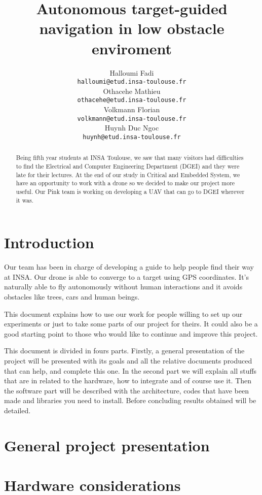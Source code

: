 \documentclass[10pt,a4paper,titlepage]{report}
\author{Halloumi Fadi\\\texttt{halloumi@etud.insa-toulouse.fr}\\
Othacehe Mathieu\\\texttt{othacehe@etud.insa-toulouse.fr}\\
Volkmann Florian\\\texttt{volkmann@etud.insa-toulouse.fr}\\
Huynh Duc Ngoc\\\texttt{huynh@etud.insa-toulouse.fr}}
\title{Autonomous target-guided navigation in low obstacle enviroment}
\begin{document}
\maketitle %
\begin{abstract} %
Being fifth year students at INSA Toulouse, we saw that many visitors had difficulties to find the Electrical and Computer Engineering Department (DGEI) and they were late for their lectures. At the end of our study in Critical and Embedded System, we have an opportunity to work with a drone so we decided to make our project more useful. Our Pink team is working on developing a UAV that can go to DGEI wherever it was.
\end{abstract}

\tableofcontents %
\clearpage


\chapter{Introduction}
Our team has been in charge of developing a guide to help people find their way at INSA. Our drone is able to converge to a target using GPS coordinates. It's naturally able to fly autonomously without human interactions and it avoids obstacles like trees, cars and human beings.

This document explains how to use our work for people willing to set up our experiments or just to take some parts of our project for theirs. It could also be a good starting point to those who would like to continue and improve this project.

This document is divided in fours parts. Firstly, a general presentation of the project will be presented with its goals and all the relative documents produced that can help, and complete this one. In the second part we will explain all stuffs that are in related to the hardware, how to integrate and of course use it. Then the software part will be described with the architecture, codes that have been made and libraries you need to install. Before concluding results obtained will be detailed.

\chapter{General project presentation}

\chapter{Hardware considerations}

\end{document}
